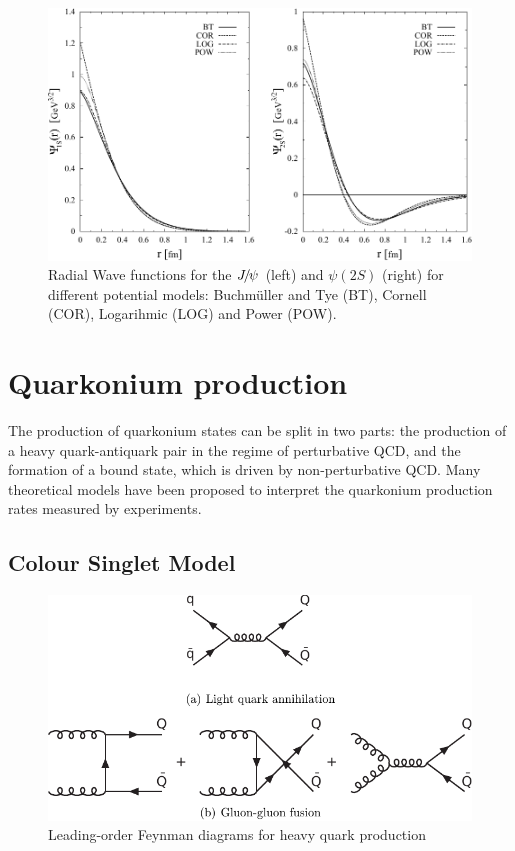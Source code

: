 \begin{figure}
\center
\includegraphics[width=\textwidth]{figs/review/psipot}
\caption{Radial Wave functions for the ${{J\mskip -3mu/\mskip -2mu\psi\mskip 2mu}}$ (left) and $\psi(2S)$ (right) for different 
potential models: Buchm\"uller and Tye (BT), Cornell (COR), Logarihmic (LOG) and Power (POW). }
\label{fig:psipot} 
\end{figure} 


\section{Quarkonium production}

The production of quarkonium states can be split in two parts: the production
of a heavy quark-antiquark pair in the regime of perturbative QCD, and the
formation of a bound state, which is driven by non-perturbative QCD. Many
theoretical models have been proposed to interpret the quarkonium production
rates measured by experiments.

\subsection{Colour Singlet Model}

\begin{figure}
\center
\includegraphics[width=\textwidth]{figs/review/heavy}
\caption{Leading-order Feynman diagrams for heavy quark production\cite{Ellis:318585}}
\label{fig:heavy} 
\end{figure} 



